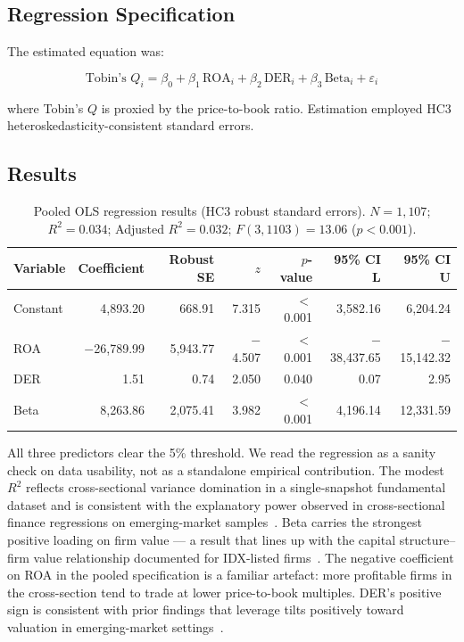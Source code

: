 \documentclass[11pt,a4paper]{article}
\begin{document}
\subsection{Regression Specification}

The estimated equation was:

\begin{equation}
\text{Tobin's } Q_i = \beta_0 + \beta_1\,\text{ROA}_i + \beta_2\,\text{DER}_i + \beta_3\,\text{Beta}_i + \varepsilon_i
\end{equation}
\label{eq:ols}

where Tobin's $Q$ is proxied by the price-to-book ratio. Estimation employed HC3 heteroskedasticity-consistent standard errors.

\subsection{Results}

\begin{table}[H]
\centering
\caption{Pooled OLS regression results (HC3 robust standard errors). $N = 1{,}107$; $R^2 = 0.034$; Adjusted $R^2 = 0.032$; $F(3,1103) = 13.06$ ($p < 0.001$).}
\label{tab:ols}
\begin{tabular}{l r r r r r r}
\toprule
\textbf{Variable} & \textbf{Coefficient} & \textbf{Robust SE} & \textbf{$z$} & \textbf{$p$-value} & \textbf{95\% CI L} & \textbf{95\% CI U} \\
\midrule
Constant &  4,893.20 &   668.91 &  7.315 & $<$0.001 &  3,582.16 &  6,204.24 \\
ROA      & $-$26,789.99 & 5,943.77 & $-$4.507 & $<$0.001 & $-$38,437.65 & $-$15,142.32 \\
DER      &      1.51 &     0.74 &  2.050 &   0.040 &      0.07 &      2.95 \\
Beta     &  8,263.86 & 2,075.41 &  3.982 & $<$0.001 &  4,196.14 & 12,331.59 \\
\bottomrule
\end{tabular}
\end{table}

All three predictors clear the 5\% threshold. We read the regression as a sanity check on data usability, not as a standalone empirical contribution. The modest $R^2$ reflects cross-sectional variance domination in a single-snapshot fundamental dataset and is consistent with the explanatory power observed in cross-sectional finance regressions on emerging-market samples~\cite{dang2018}. Beta carries the strongest positive loading on firm value — a result that lines up with the capital structure--firm value relationship documented for IDX-listed firms~\cite{purba2025,sari2024,wijaya2022}. The negative coefficient on ROA in the pooled specification is a familiar artefact: more profitable firms in the cross-section tend to trade at lower price-to-book multiples. DER's positive sign is consistent with prior findings that leverage tilts positively toward valuation in emerging-market settings~\cite{purba2025,sari2024}.
\end{document}
